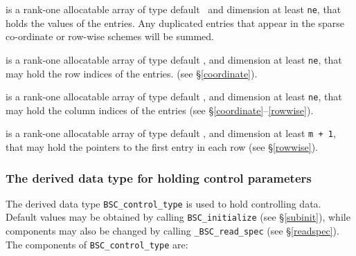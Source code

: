 \documentclass{galahad}
\newcommand{\packagename}{BSC}
\newcommand{\fullpackagename}{\libraryname\_\packagename}
\begin{document}
\begin{description}
 is a rank-one allocatable array of type default \realdp\, 
and dimension at least {\tt ne}, that holds the values of the entries. 
Any duplicated entries that appear in the sparse 
co-ordinate or row-wise schemes will be summed. 

 is a rank-one allocatable array of type default \integer, 
and dimension at least {\tt ne}, that may hold the row indices of the entries. 
(see \S\ref{coordinate}).

 is a rank-one allocatable array of type default \integer, 
and dimension at least {\tt ne}, that may hold the column indices of the entries
(see \S\ref{coordinate}--\ref{rowwise}).

 is a rank-one allocatable array of type default \integer, 
and dimension at least {\tt m + 1}, that may hold the pointers to
the first entry in each row (see \S\ref{rowwise}).

\end{description}



\subsubsection{The derived data type for holding control 
 parameters}\label{typecontrol}
The derived data type 
{\tt \packagename\_control\_type} 
is used to hold controlling data. Default values may be obtained by calling 
{\tt \packagename\_initialize}
(see \S\ref{subinit}),
while components may also be changed by calling 
{\tt \fullpackagename\_read\-\_spec}
(see \S\ref{readspec}). 
The components of 
{\tt \packagename\_control\_type} 
are:
\end{document}
